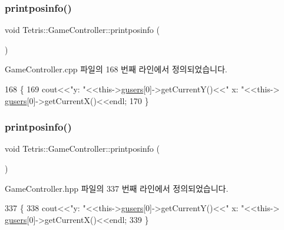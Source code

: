 \subsubsection{\texorpdfstring{printposinfo()}{printposinfo()}\hspace{0.1cm}{\footnotesize\ttfamily [1/2]}}
{\footnotesize\ttfamily void Tetris\+::\+Game\+Controller\+::printposinfo (\begin{DoxyParamCaption}{ }\end{DoxyParamCaption})}



Game\+Controller.\+cpp 파일의 168 번째 라인에서 정의되었습니다.


\begin{DoxyCode}
168                                      \{
169                 cout<<\textcolor{stringliteral}{"y: "}<<this->\hyperlink{class_tetris_1_1_game_controller_a1a31d3a933daad6d95e20458eea2900e}{gusers}[0]->getCurrentY()<<\textcolor{stringliteral}{"  x: "}<<this->
      \hyperlink{class_tetris_1_1_game_controller_a1a31d3a933daad6d95e20458eea2900e}{gusers}[0]->getCurrentX()<<endl;
170             \}
\end{DoxyCode}
\mbox{\label{class_tetris_1_1_game_controller_a269da7d33475ae2f327ee9a51f02ef52}} 
\subsubsection{\texorpdfstring{printposinfo()}{printposinfo()}\hspace{0.1cm}{\footnotesize\ttfamily [2/2]}}
{\footnotesize\ttfamily void Tetris\+::\+Game\+Controller\+::printposinfo (\begin{DoxyParamCaption}{ }\end{DoxyParamCaption})\hspace{0.3cm}{\ttfamily [inline]}}



Game\+Controller.\+hpp 파일의 337 번째 라인에서 정의되었습니다.


\begin{DoxyCode}
337                                \{
338                 cout<<\textcolor{stringliteral}{"y: "}<<this->\hyperlink{class_tetris_1_1_game_controller_a1a31d3a933daad6d95e20458eea2900e}{gusers}[0]->getCurrentY()<<\textcolor{stringliteral}{"  x: "}<<this->
      \hyperlink{class_tetris_1_1_game_controller_a1a31d3a933daad6d95e20458eea2900e}{gusers}[0]->getCurrentX()<<endl;
339             \}
\end{DoxyCode}
\mbox{\label{class_tetris_1_1_game_controller_aa95d44d0084ac5537f1c753796df4565}} 
